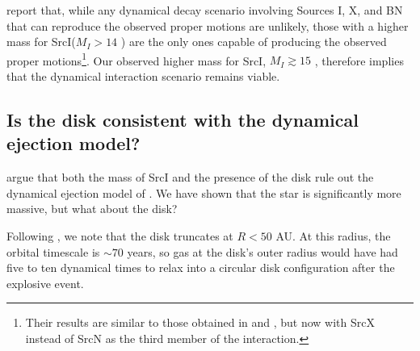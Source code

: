 \documentclass[twocolumn]{aastex61}
\newcommand{\sourcei}{SrcI\xspace}
\newcommand{\sourcen}{SrcN\xspace}
\newcommand{\sourcex}{SrcX\xspace}
\begin{document}
\citet{Farias2017a} report that, while any dynamical decay scenario involving
Sources I, X, and BN that can reproduce the observed proper motions are
unlikely, those with a higher mass for \sourcei ($M_I>14$ \msun) are the only
ones capable of producing the observed proper motions\footnote{Their results
are similar to those obtained in \citet{Goddi2011b} and \citet{Moeckel2012b},
but now with \sourcex instead of \sourcen as the third member of the
interaction.}.  Our observed higher mass for \sourcei, $M_I\gtrsim15$ \msun,
therefore implies that the
dynamical interaction scenario remains viable.



\subsection{Is the disk consistent with the dynamical ejection model?}
\citet{Plambeck2016a} argue that both the mass of \sourcei and the presence of
the disk rule out the dynamical ejection model of \citet{Bally2011a}.  We have
shown that the star is significantly more massive, but what about the disk?

Following \citet{Bally2011a}, we note that the disk truncates at $R<50$
AU.  At this radius, the orbital timescale is $\sim70$ years, so gas at the
disk's outer radius would have had five to ten dynamical times to relax into a
circular disk configuration after the explosive event.
\end{document}
